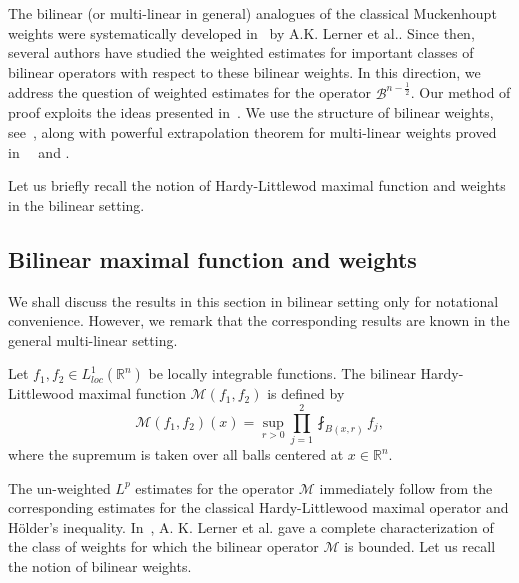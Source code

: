 \documentclass[a4paper,12pt]{amsart}
\newcommand{\R}{{\mathbb {R}}}
\begin{document}
The bilinear (or multi-linear in general) analogues of the classical Muckenhoupt weights were systematically developed in~\cite{Ler1} by A.K. Lerner et al.. Since then, several authors have studied the weighted estimates for important classes of bilinear operators with respect to these bilinear weights. In this direction, we address the question of weighted estimates for the operator $\mathcal {B}^{n-\frac{1}{2}}$. Our method of proof exploits the ideas presented in~\cite{XQ, Bern1}. We use the structure of bilinear weights, see~\cite{Ler1}, along with  powerful extrapolation theorem for multi-linear weights proved in~~\cite{KJS, KJHS} and \cite{Bas}. 

Let us briefly recall the notion of Hardy-Littlewod maximal function and weights in the bilinear setting. 



\subsection{Bilinear maximal function and weights}\label{pre}
We shall discuss the results in this section in bilinear setting only for notational convenience. However, we remark that the corresponding results are known in the general multi-linear setting. 

 Let $f_{1},f_{2}\in L^{1}_{loc}(\mathbb{R}^{n})$ be locally integrable functions. The bilinear Hardy-Littlewood maximal function $\mathcal{M}(f_{1},f_2)$ is defined by 
$$\mathcal{M}(f_{1},f_{2})(x)=\sup_{r>0}\prod^{2}_{j=1}\fint_{B(x,r)} f_{j} ,$$
 where the supremum is taken over all balls centered at $x\in \R^n$. 
 
The un-weighted $L^p$ estimates for the operator $\mathcal M$ immediately follow from the corresponding estimates for the classical Hardy-Littlewood maximal operator and H\"{o}lder's inequality. In~\cite{Ler1}, A. K. Lerner et al.  gave a complete characterization of the class of weights for which the bilinear operator $\mathcal M$ is bounded. Let us recall the notion of bilinear weights.  
\end{document}
